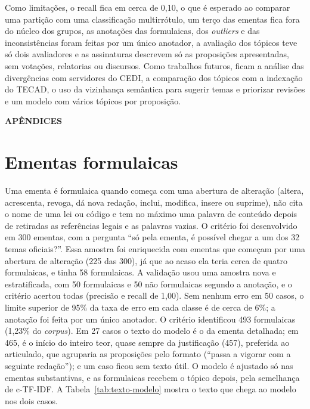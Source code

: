 \documentclass[12pt]{article}
\begin{document}
Como limitações, o recall fica em cerca de 0,10, o que é esperado ao comparar uma partição com uma classificação multirrótulo, um terço das ementas fica fora do núcleo dos grupos, as anotações das formulaicas, dos \textit{outliers} e das inconsistências foram feitas por um único anotador, a avaliação dos tópicos teve só dois avaliadores e as assinaturas descrevem só as proposições apresentadas, sem votações, relatorias ou discursos. Como trabalhos futuros, ficam a análise das divergências com servidores do CEDI, a comparação dos tópicos com a indexação do TECAD, o uso da vizinhança semântica para sugerir temas e priorizar revisões e um modelo com vários tópicos por proposição.



\clearpage
\begin{center}
{\Large\textbf{APÊNDICES}}
\end{center}

\appendix

\section{Ementas formulaicas}
\label{app:formulaicas}

Uma ementa é formulaica quando começa com uma abertura de alteração (altera, acrescenta, revoga, dá nova redação, inclui, modifica, insere ou suprime), não cita o nome de uma lei ou código e tem no máximo uma palavra de conteúdo depois de retiradas as referências legais e as palavras vazias. O critério foi desenvolvido em 300 ementas, com a pergunta ``só pela ementa, é possível chegar a um dos 32 temas oficiais?''. Essa amostra foi enriquecida com ementas que começam por uma abertura de alteração (225 das 300), já que ao acaso ela teria cerca de quatro formulaicas, e tinha 58 formulaicas. A validação usou uma amostra nova e estratificada, com 50 formulaicas e 50 não formulaicas segundo a anotação, e o critério acertou todas (precisão e recall de 1,00). Sem nenhum erro em 50 casos, o limite superior de 95\% da taxa de erro em cada classe é de cerca de 6\%; a anotação foi feita por um único anotador. O critério identificou 493 formulaicas (1,23\% do \textit{corpus}). Em 27 casos o texto do modelo é o da ementa detalhada; em 465, é o início do inteiro teor, quase sempre da justificação (457), preferida ao articulado, que agruparia as proposições pelo formato (``passa a vigorar com a seguinte redação''); e um caso ficou sem texto útil. O modelo é ajustado só nas ementas substantivas, e as formulaicas recebem o tópico depois, pela semelhança de c-TF-IDF. A Tabela~\ref{tab:texto-modelo} mostra o texto que chega ao modelo nos dois casos.
\end{document}
